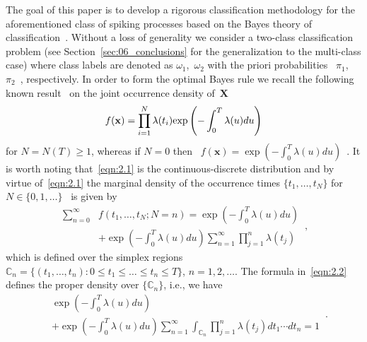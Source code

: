 \documentclass[lettersize,journal,onecolumn]{IEEEtran}
\theoremstyle{definition}
\begin{document}
The goal of this paper is to develop a rigorous classification methodology for the 
aforementioned class of spiking processes based on the Bayes theory of 
classification~\cite{devroye2013probabilistic}. Without a loss of generality we 
consider a two-class classification problem (see Section~\ref{sec:06_conclusions} for 
the generalization to the multi-class case) where class labels are denoted as 
\mbox{$\omega_{1}$, $\omega_{2}$} with the priori probabilities \mbox{
	$\pi_{1}$, $\pi_{2}$
},  respectively. In order to form the optimal Bayes rule we recall the following known 
result~\cite{daley2003introduction} on the joint 
occurrence density of~$\mathbf{X}$
\begin{equation}
	f(\mathbf{x})=\prod_{i=1}^{N}\lambda(t_{i})
	{\rm exp}\left(-\int_{0}^{T}\lambda(u)du\right) 
	\label{eqn:2.1}
\end{equation}
for $N=N(T)\geq1$, whereas if $N=0$ then \mbox{
	$f(\mathbf{x})=\exp\left(-\int_{0}^{T}\lambda(u)du\right)$
}. It is worth noting that~\eqref{eqn:2.1} is the continuous-discrete distribution and 
by virtue of~\eqref{eqn:2.1} the marginal density of the 
occurrence times \mbox{$\lbrace t_1,\ldots,t_N \rbrace$} for \mbox{
	$N \in \lbrace 0,1,\ldots \rbrace$
} is given by
\begin{equation}
	\begin{split}
		\sum_{n=0}^{\infty} & f\left(t_1,\ldots,t_N; N=n\right) =
		\exp\left(-\int_{0}^{T}\lambda(u)du\right) \\
		& + \exp\left(-\int_{0}^{T}\lambda(u)du\right)
		\sum_{n=1}^{\infty} \prod_{j=1}^{n} \lambda(t_j)
	\end{split}
	\,,
	\label{eqn:2.2}
\end{equation}
which is defined over the simplex regions \mbox{$
	\mathbb{C}_n=\lbrace \left(t_1,\ldots,t_n \right):
	0 \leq t_1 \le \ldots \le t_n \leq T \rbrace
	$}, \mbox{$n=1,2,\ldots$}. The formula in~\eqref{eqn:2.2} defines the proper density 
over $\{\mathbb{C}_n\}$, i.e., we have
\begin{equation}
	\begin{split}
		& \exp\left(-\int_{0}^{T}\lambda(u)du\right) \\
		& +
		\exp\left(-\int_{0}^{T}\lambda(u)du\right)
		\sum_{n=1}^{\infty} \int_{\mathbb{C}_n} \prod_{j=1}^{n} \lambda(t_j) 
		dt_1 \cdots dt_n
		= 1
	\end{split}
	\label{eqn:2.2a}\,.
\end{equation}
\end{document}
